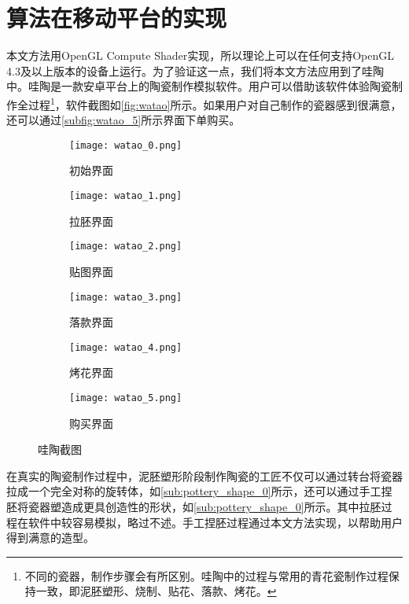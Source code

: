 \chapter{算法在移动平台的实现}
本文方法用OpenGL Compute Shader实现，所以理论上可以在任何支持OpenGL 4.3及以上版本的设备上运行。为了验证这一点，我们将本文方法应用到了哇陶中。哇陶是一款安卓平台上的陶瓷制作模拟软件。用户可以借助该软件体验陶瓷制作全过程\footnote{不同的瓷器，制作步骤会有所区别。哇陶中的过程与常用的青花瓷制作过程保持一致，即泥胚塑形、烧制、贴花、落款、烤花。}，软件截图如\autoref{fig:watao}所示。如果用户对自己制作的瓷器感到很满意，还可以通过\autoref{subfig:watao_5}所示界面下单购买。

\begin{figure}[htbp]
	\centering
	\begin{subfigure}[b]{.32\textwidth}
		\centering
		\texttt{[image: watao\_0.png]}
		\caption{初始界面}\label{subfig:watao_0}
	\end{subfigure}
	\begin{subfigure}[b]{.32\textwidth}
		\centering
		\texttt{[image: watao\_1.png]}
		\caption{拉胚界面}\label{subfig:watao_1}
	\end{subfigure}
	\begin{subfigure}[b]{.32\textwidth}
		\centering
		\texttt{[image: watao\_2.png]}
		\caption{贴图界面}\label{subfig:watao_2}
	\end{subfigure}

    \par
	\begin{subfigure}[b]{.32\textwidth}
		\centering
		\texttt{[image: watao\_3.png]}
		\caption{落款界面}\label{subfig:watao_3}
	\end{subfigure}
	\begin{subfigure}[b]{.32\textwidth}
		\centering
		\texttt{[image: watao\_4.png]}
		\caption{烤花界面}\label{subfig:watao_4}
	\end{subfigure}
	\begin{subfigure}[b]{.32\textwidth}
		\centering
		\texttt{[image: watao\_5.png]}
		\caption{购买界面}\label{subfig:watao_5}
	\end{subfigure}

	\caption{哇陶截图}\label{fig:watao}
\end{figure}

在真实的陶瓷制作过程中，泥胚塑形阶段制作陶瓷的工匠不仅可以通过转台将瓷器拉成一个完全对称的旋转体，如\autoref{sub:pottery_shape_0}所示，还可以通过手工捏胚将瓷器塑造成更具创造性的形状，如\autoref{sub:pottery_shape_0}所示。其中拉胚过程在软件中较容易模拟，略过不述。手工捏胚过程通过本文方法实现，以帮助用户得到满意的造型。


